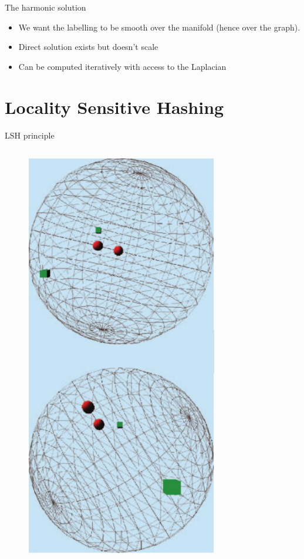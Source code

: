 \documentclass[11pt)]{beamer}
\begin{document}
\begin{frame}{The harmonic solution}
\begin{itemize}
 \item We want the labelling to be smooth over the manifold (hence over the graph).
 \item Direct solution exists but doesn't scale
 \item Can be computed iteratively with access to the Laplacian
\end{itemize}
\end{frame}
\section{Locality Sensitive Hashing}
\begin{frame}{LSH principle}
\begin{columns}[onlytextwidth]
 \begin{column}{0.4\textwidth}
  \begin{figure}
    \includegraphics[width=0.75\textwidth]{spheres.eps}

\end{figure}
\end{column}
\end{columns}
\end{frame}
\end{document}
